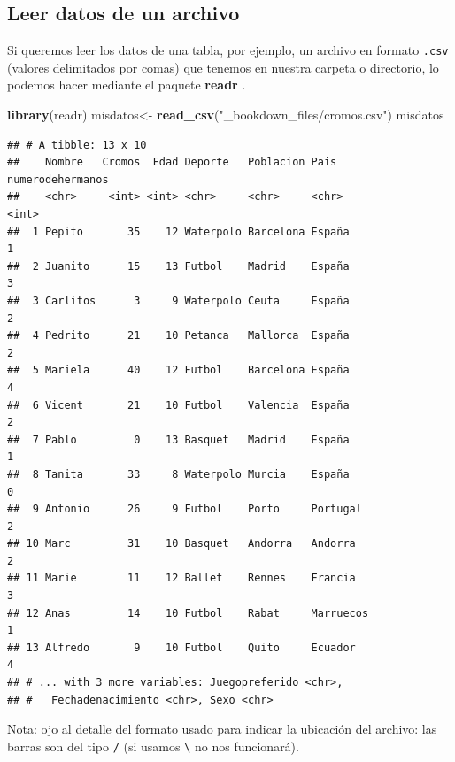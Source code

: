 \documentclass[]{book}
\newenvironment{Shaded}{\begin{snugshade}}{\end{snugshade}}
\newcommand{\KeywordTok}[1]{\textcolor[rgb]{0.13,0.29,0.53}{\textbf{#1}}}
\newcommand{\NormalTok}[1]{#1}
\newcommand{\StringTok}[1]{\textcolor[rgb]{0.31,0.60,0.02}{#1}}
\theoremstyle{definition}
\theoremstyle{definition}
\theoremstyle{definition}
\theoremstyle{remark}
\begin{document}
\hypertarget{leer-datos-de-un-archivo}{%
\subsection{Leer datos de un archivo}\label{leer-datos-de-un-archivo}}

Si queremos leer los datos de una tabla, por ejemplo, un archivo en
formato \texttt{.csv} (valores delimitados por comas) que tenemos en
nuestra carpeta o directorio, lo podemos hacer mediante el paquete
\textbf{readr} \citep{R-readr}.

\begin{Shaded}
\begin{Highlighting}[]
\KeywordTok{library}\NormalTok{(readr)}
\NormalTok{misdatos<-}\StringTok{ }\KeywordTok{read_csv}\NormalTok{(}\StringTok{"_bookdown_files/cromos.csv"}\NormalTok{)}
\NormalTok{misdatos}
\end{Highlighting}
\end{Shaded}

\begin{verbatim}
## # A tibble: 13 x 10
##    Nombre   Cromos  Edad Deporte   Poblacion Pais      numerodehermanos
##    <chr>     <int> <int> <chr>     <chr>     <chr>                <int>
##  1 Pepito       35    12 Waterpolo Barcelona España                   1
##  2 Juanito      15    13 Futbol    Madrid    España                   3
##  3 Carlitos      3     9 Waterpolo Ceuta     España                   2
##  4 Pedrito      21    10 Petanca   Mallorca  España                   2
##  5 Mariela      40    12 Futbol    Barcelona España                   4
##  6 Vicent       21    10 Futbol    Valencia  España                   2
##  7 Pablo         0    13 Basquet   Madrid    España                   1
##  8 Tanita       33     8 Waterpolo Murcia    España                   0
##  9 Antonio      26     9 Futbol    Porto     Portugal                 2
## 10 Marc         31    10 Basquet   Andorra   Andorra                  2
## 11 Marie        11    12 Ballet    Rennes    Francia                  3
## 12 Anas         14    10 Futbol    Rabat     Marruecos                1
## 13 Alfredo       9    10 Futbol    Quito     Ecuador                  4
## # ... with 3 more variables: Juegopreferido <chr>,
## #   Fechadenacimiento <chr>, Sexo <chr>
\end{verbatim}

Nota: ojo al detalle del formato usado para indicar la ubicación del
archivo: las barras son del tipo \texttt{/} (si usamos
\texttt{\textbackslash{}} no nos funcionará).
\end{document}
